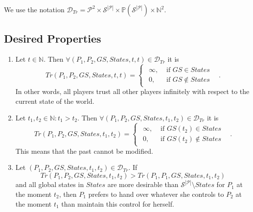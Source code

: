     We use the notation $\mathcal{D}_{Tr} = \mathcal{P}^2 \times \mathcal{S}^{|\mathcal{P}|} \times
    \mathbb{P}\left(\mathcal{S}^{|\mathcal{P}|}\right) \times \mathbb{N}^2$.

  \subsection{Desired Properties}
    \begin{enumerate}
      \item Let $t \in \mathbb{N}$. Then $\forall \left(P_1, P_2, GS, States, t, t\right) \in \mathcal{D}_{Tr}$ it is
      \begin{equation*}
        Tr\left(P_1, P_2, GS, States, t, t\right) =
	\begin{cases}
	\begin{aligned}
	  \infty, & \mbox{ if } GS \in States \\
          0, & \mbox{ if } GS \notin States
	\end{aligned}
	\end{cases} \enspace.
      \end{equation*}
      In other words, all players trust all other players infinitely with respect to the current state of the world.

      \item Let $t_1, t_2 \in \mathbb{N}: t_1 > t_2$. Then $\forall \left(P_1, P_2, GS, States, t_1, t_2\right) \in
      \mathcal{D}_{Tr}$ it is
      \begin{equation*}
        Tr\left(P_1, P_2, GS, States, t_1, t_2\right) =
	\begin{cases}
	\begin{aligned}
	  \infty, & \mbox{ if } GS\left(t_2\right) \in States \\
          0, & \mbox{ if } GS\left(t_2\right) \notin States
	\end{aligned}
	\end{cases} \enspace.
      \end{equation*}
      This means that the past cannot be modified.

      \item Let $\left(P_1, P_2, GS, States, t_1, t_2\right) \in \mathcal{D}_{Tr}$. If 
      \begin{equation*}
        Tr\left(P_1, P_2, GS, States, t_1, t_2\right) > Tr\left(P_1, P_1, GS, States, t_1, t_2\right)
      \end{equation*}
      and all global states in $States$ are more desirable than $\mathcal{S}^{|\mathcal{P}|} \setminus States$ for $P_1$ at
      the moment $t_2$, then $P_1$ prefers to hand over whatever she controls to $P_2$ at the moment $t_1$ than maintain this
      control for herself.
    \end{enumerate}
